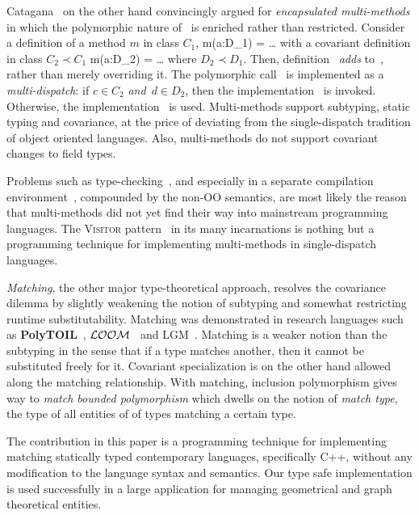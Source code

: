\documentclass[11pt]{article}
\numberwithin{figure}{section}
\newcommand\CC{\Lang{\mbox{C++}}\xspace}
\newcommand\Lang[1]{\textsc{#1}}
\newcommand{\LOOM}{\ensuremath{\cal{LOOM}}\xspace}
\newcommand{\PolyTOIL}{\textbf{PolyTOIL}\xspace}
\begin{document}
Catagana~\cite{Castagna:95} on the other hand
    convincingly argued for \emph{encapsulated multi-methods} in which
    the polymorphic nature of~ is enriched
    rather than restricted.
Consider a definition of a method $m$ in class $C_1$,
    m(a:D_1) = \ldots
\eeq
with a covariant definition in class $C_2 \prec C_1$
    m(a:D_2) = \ldots
\eeq
where $D_2 \prec D_1$.
Then, definition~ \emph{adds}
    to~, rather than merely
    overriding it.
The polymorphic call~ is implemented
    as a \emph{multi-dispatch}:
    if $c \in C_2$ \emph{and}~$d \in D_2$,
        then the implementation~ is invoked.
Otherwise, the implementation~ is used.
Multi-methods support subtyping, static typing and covariance,
    at the price of deviating from the single-dispatch tradition
    of object oriented languages.
Also, multi-methods do not support covariant changes to field
    types.

Problems such as type-checking~\cite{Chambers:Leavens:95},
    and especially in a separate
    compilation environment~\cite{Millstein:Chmabers:99}, compounded
    by the non-OO semantics, are most likely the reason
    that multi-methods did not yet find their way into
    mainstream programming languages.
The \textsc{Visitor} pattern~\cite{Gamma:Helm:Johnson:Vlissides:Book:95} in its many
    incarnations is nothing but
    a programming technique for implementing multi-methods in
    single-dispatch languages.

\emph{Matching}, the other major
    type-theoretical approach, resolves the covariance dilemma
    by slightly weakening the notion of subtyping and
    somewhat restricting runtime substitutability.
Matching was demonstrated in research languages
    such as \PolyTOIL~\cite{Bruce:Fiech:Schuett:vanGent:95},
    \LOOM~\cite{Bruce:Fiech:Petersen:97} and
    LGM~\cite{Rinat:00}.
Matching is a weaker notion than
    the subtyping in the sense that if a type
    matches another, then it cannot be substituted freely
    for it.
Covariant specialization is on the other hand allowed
    along the matching relationship.
With matching, inclusion polymorphism gives
    way to \emph{match bounded polymorphism} which dwells on the notion
    of \emph{match type}, the type of all entities of
    of types matching a certain type.

The contribution in this paper is a programming
    technique for implementing matching
    statically typed contemporary languages,
    specifically \CC, without any modification
    to the language syntax and semantics.
Our type safe implementation is used
    successfully in a large application for
    managing geometrical and graph theoretical
    entities.
\end{document}
